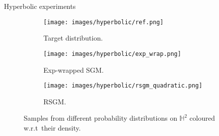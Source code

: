    
   \begin{frame}{Hyperbolic experiments}
       \begin{figure}
       \centering
       \hfill
       \begin{subfigure}[t]{0.28\textwidth}
           \texttt{[image: images/hyperbolic/ref.png]}
           \caption{Target distribution.}
       \end{subfigure}
       \hfill
       \begin{subfigure}[t]{0.28\textwidth}
           \texttt{[image: images/hyperbolic/exp\_wrap.png]}
           \caption{Exp-wrapped SGM.}
       \end{subfigure}
       \hfill
       \begin{subfigure}[t]{0.28\textwidth}
           \texttt{[image: images/hyperbolic/rsgm\_quadratic.png]}
           \caption{RSGM.}
       \end{subfigure}
       \hfill
        \caption{Samples from different probability distributions on $\mathbb{H}^2$ coloured w.r.t\ their density.}
       \label{fig:hyperbolic}
   \end{figure}
   \end{frame}
   
   
   